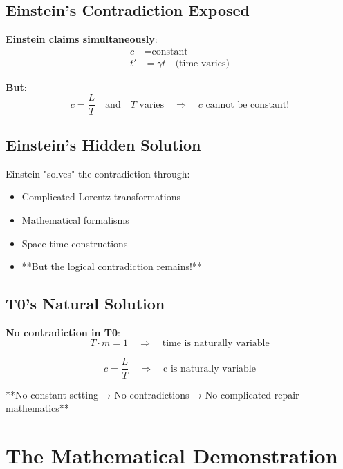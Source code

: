 \documentclass[12pt,a4paper]{article}
\newcommand{\Tfield}{T}
\begin{document}
{{			\subsection{Einstein's Contradiction Exposed}
			
			\textbf{Einstein claims simultaneously}:
			\begin{align}
				c &= \text{constant} \\
				t' &= \gamma t \quad \text{(time varies)}
			\end{align}
			
			\textbf{But}:
			\begin{equation}
				c = \frac{L}{T} \quad \text{and} \quad T \text{ varies} \quad \Rightarrow \quad c \text{ cannot be constant!}
			\end{equation}
			
			\subsection{Einstein's Hidden Solution}
			
			Einstein "solves" the contradiction through:
			\begin{itemize}
				\item Complicated Lorentz transformations
				\item Mathematical formalisms
				\item Space-time constructions
				\item **But the logical contradiction remains!**
			\end{itemize}
			
			\subsection{T0's Natural Solution}
			
			\textbf{No contradiction in T0}:
			\begin{equation}
				\Tfield \cdot m = 1 \quad \Rightarrow \quad \text{time is naturally variable}
			\end{equation}
			
			\begin{equation}
				c = \frac{L}{T} \quad \Rightarrow \quad \text{c is naturally variable}
			\end{equation}
			
			**No constant-setting → No contradictions → No complicated repair mathematics**
			
			\section{The Mathematical Demonstration}
			
}}
\end{document}
